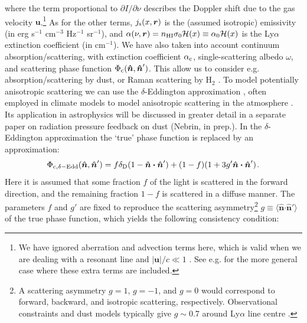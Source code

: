 \documentclass[fleqn,usenatbib]{mnras}
\begin{document}
where the term proportional to $\partial I/\partial \nu$ describes the Doppler shift due to the gas velocity $\boldsymbol{u}$.\footnote{We have ignored aberration and advection terms here, which is valid when we are dealing with a resonant line and $\lvert \boldsymbol{u} \rvert/c \ll 1$ \citep{Mihalas1975}. See e.g. \cite{Castor2004} for the more general case where these extra terms are included.} As for the other terms, $j_{\rm s}(x, \boldsymbol{r})$ is the (assumed isotropic) emissivity (in erg s$^{-1}$ cm$^{-3}$ Hz$^{-1}$ sr$^{-1}$), and $\alpha(\nu, \boldsymbol{r}) = n_{\rm HI} \sigma_{0} \mathcal{H}(x) \equiv \alpha_0 \mathcal{H}(x)$ is the Ly$\alpha$ extinction coefficient (in cm$^{-1}$). We have also taken into account continuum absorption/scattering, with extinction coefficient $\alpha_{\rm c}$, single-scattering albedo $\omega$, and scattering phase function $\Phi_{\rm c}(\boldsymbol{\hat{n}}, \boldsymbol{\hat{n}}')$. This allow us to consider e.g. absorption/scattering by dust, or Raman scattering by H$_2$ \citep[e.g.][]{Dalgarno1962, Oklopcic2016}. To model potentially anisotropic scattering we can use the $\delta$-Eddington approximation \citep{Joseph1976,Wiscombe1977}, often employed in climate models to model anisotropic scattering in the atmosphere \cite[e.g.][]{NCAR1992}. Its application in astrophysics will be discussed in greater detail in a separate paper on radiation pressure feedback on dust (Nebrin, in prep.). In the $\delta$-Eddington approximation the `true' phase function \citep[e.g.][]{Henyey1941, Draine2003albedo} is replaced by an approximation:
\begin{equation}
    \Phi_{\rm c, \delta-Edd}(\boldsymbol{\hat{n}}, \boldsymbol{\hat{n}}') = f \delta_{\rm D}(1 - \boldsymbol{\hat{n}} \boldsymbol{\cdot} \boldsymbol{\hat{n}}') + (1-f)(1 + 3 g' \boldsymbol{\hat{n}} \boldsymbol{\cdot} \boldsymbol{\hat{n}}') \hspace{1 pt}.
\end{equation}
Here it is assumed that some fraction $f$ of the light is scattered in the forward direction, and the remaining fraction $1-f$ is scattered in a diffuse manner. The parameters $f$ and $g'$ are fixed to reproduce the scattering asymmetry\footnote{A scattering asymmetry $g = 1$, $g = -1$, and $g = 0$ would correspond to forward, backward, and isotropic scattering, respectively. Observational constraints and dust models typically give $g \sim 0.7$ around Ly$\alpha$ line centre \citep{Draine2003albedo, Gordon2004, Akshaya2019}.} $g \equiv \langle  \boldsymbol{\hat{n}} \boldsymbol{\cdot} \boldsymbol{\hat{n}}' \rangle$ of the true phase function, which yields the following consistency condition:
\end{document}
